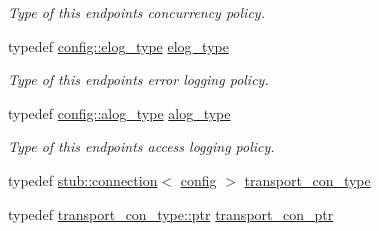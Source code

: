 \begin{DoxyCompactItemize}
\begin{DoxyCompactList}\small\item\em Type of this endpoint\textquotesingle{}s concurrency policy. \end{DoxyCompactList}\item 
typedef \hyperlink{classwebsocketpp_1_1log_1_1stub}{config\+::elog\+\_\+type} \hyperlink{classwebsocketpp_1_1transport_1_1stub_1_1endpoint_a7890584ddff40571589f62c52bc5b080}{elog\+\_\+type}\hypertarget{classwebsocketpp_1_1transport_1_1stub_1_1endpoint_a7890584ddff40571589f62c52bc5b080}{}\label{classwebsocketpp_1_1transport_1_1stub_1_1endpoint_a7890584ddff40571589f62c52bc5b080}

\begin{DoxyCompactList}\small\item\em Type of this endpoint\textquotesingle{}s error logging policy. \end{DoxyCompactList}\item 
typedef \hyperlink{classwebsocketpp_1_1log_1_1stub}{config\+::alog\+\_\+type} \hyperlink{classwebsocketpp_1_1transport_1_1stub_1_1endpoint_aa62a4dd626d9b8757972c0ef66e72419}{alog\+\_\+type}\hypertarget{classwebsocketpp_1_1transport_1_1stub_1_1endpoint_aa62a4dd626d9b8757972c0ef66e72419}{}\label{classwebsocketpp_1_1transport_1_1stub_1_1endpoint_aa62a4dd626d9b8757972c0ef66e72419}

\begin{DoxyCompactList}\small\item\em Type of this endpoint\textquotesingle{}s access logging policy. \end{DoxyCompactList}\item 
typedef \hyperlink{classwebsocketpp_1_1transport_1_1stub_1_1connection}{stub\+::connection}$<$ \hyperlink{classconfig}{config} $>$ \hyperlink{classwebsocketpp_1_1transport_1_1stub_1_1endpoint_a6486b94320ba134cb60a63b4c40194a0}{transport\+\_\+con\+\_\+type}
\item 
typedef \hyperlink{classwebsocketpp_1_1transport_1_1stub_1_1connection_aeb856d2a6734d303e13bed57c3d1081b}{transport\+\_\+con\+\_\+type\+::ptr} \hyperlink{classwebsocketpp_1_1transport_1_1stub_1_1endpoint_af2bad83f2577d578712642e11767efe1}{transport\+\_\+con\+\_\+ptr}
\end{DoxyCompactItemize}
